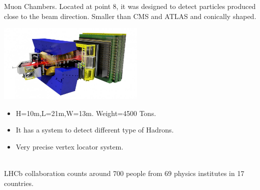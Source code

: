 \documentclass[8pt]{beamer}
\begin{document}
\begin{frame}[fragile]{Muon Chambers.}
	Located at point 8, it was designed to detect particles produced close to the beam direction.
	Smaller than CMS and ATLAS and conically shaped.
	
	\vspace{0.5cm}
	\begin{minipage}{0.7\textwidth}%
		\includegraphics[width=7cm]{8}
	\end{minipage}%
	\hfill%
	\begin{minipage}{0.3\textwidth}\raggedleft
		\begin{itemize}
			\item H=10m,L=21m,W=13m. Weight=4500 Tons.		
			\item It has a system to detect different type of Hadrons.
			\item Very precise vertex locator system.
			
		\end{itemize}
	\end{minipage}
	\\
	\vspace{0.5cm}
	LHCb collaboration counts around 700 people from 69 physics institutes in 17 countries.
\end{frame}
\end{document}
